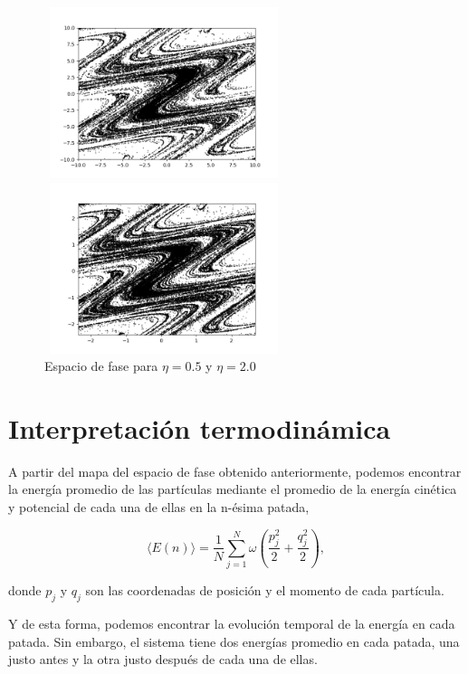 \documentclass[letterpaper,12pt,oneside]{book}
\begin{document}
	\begin{figure}[h!]
		\centering
		\begin{minipage}{0.35\textwidth}
			\centering
			\includegraphics[width=7cm,height=5cm]{Figures/Eta05}
		\end{minipage}
		\begin{minipage}{0.35\textwidth}
			\centering
			\includegraphics[width=7cm,height=5cm]{Figures/Eta20}
		\end{minipage}
		\caption{Espacio de fase para $\eta=0.5$ y $\eta=2.0$}
		\label{Img:Reescalamiento}
	\end{figure}

	\section{Interpretaci\'on termodin\'amica}
	
	A partir del mapa del espacio de fase obtenido anteriormente, podemos encontrar la energía promedio de las partículas mediante el promedio de la energía cinética y potencial de cada una de ellas en la n-ésima patada,
	
	\begin{equation}
	\langle E(n) \rangle = \frac{1}{N}\sum_{j=1}^{N} \omega(\frac{p_j^2}{2} + \frac{q_j^2}{2}),
	\end{equation}
	
	\noindent donde $p_j$ y $q_j$ son las coordenadas de posición y el momento de cada partícula.
	
	
	Y de esta forma, podemos encontrar la evolución temporal de la energía en cada patada. Sin embargo, el sistema tiene dos energías promedio en cada patada, una justo antes y la otra justo después de cada una de ellas.
	
\end{document}
